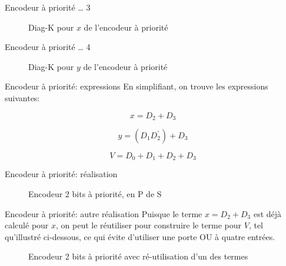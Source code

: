 \documentclass[presentation]{beamer}
\begin{document}
\begin{frame}[label={sec:orgb73355e}]{Encodeur à priorité \ldots{} 3}
\begin{figure}[htbp]
\centering

\caption{\label{fig:orge23f31f}Diag-K pour \(x\) de l'encodeur à priorité}
\end{figure}
\end{frame}

\begin{frame}[label={sec:org005e525}]{Encodeur à priorité \ldots{} 4}
\begin{figure}[htbp]
\centering

\caption{\label{fig:orgc896d70}Diag-K pour \(y\) de l'encodeur à priorité}
\end{figure}
\end{frame}

\begin{frame}[label={sec:org727ac6f}]{Encodeur à priorité: expressions}
En simplifiant, on trouve les expressions suivantes:

$$ x = D_2 + D_3 $$

$$ y = (D_1 D_2^\prime) + D_3 $$

$$ V = D_0 + D_1 + D_2 + D_3 $$
\end{frame}

\begin{frame}[label={sec:orgecde68a}]{Encodeur à priorité: réalisation}
\begin{figure}[htbp]
\centering

\caption{\label{fig:org122622a}Encodeur 2 bits à priorité, en P de S}
\end{figure}
\end{frame}

\begin{frame}[label={sec:org56d140a}]{Encodeur à priorité: autre réalisation}
Puisque le terme \(x = D_2 + D_3\) est déjà calculé pour \(x\), on
peut le réutiliser pour construire le terme pour \(V\), tel
qu'illustré ci-dessous, ce qui évite d'utiliser une porte OU à quatre
entrées.

\begin{figure}[htbp]
\centering

\caption{\label{fig:orge7c469b}Encodeur 2 bits à priorité avec ré-utilisation d'un des termes}
\end{figure}
\end{frame}
\end{document}
